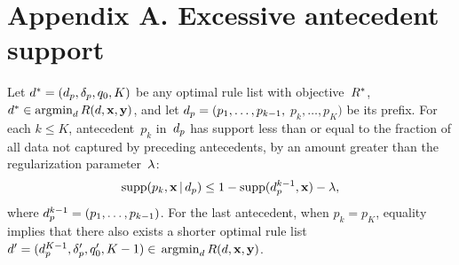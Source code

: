 \section*{Appendix A. Excessive antecedent support}

\begin{theorem}
\label{thm:ub-support}
Let ${d^* = (d_p, \delta_p, q_0, K)}$
be any optimal rule list with objective~$R^*$, \ie
${d^* \in \operatorname*{argmin}_{d} R({d}, \mathbf{x}, \mathbf{y})}$,
and let ${d_p = (p_1, \dots, p_{k-1},}$
${p_k, \dots, p_K)}$ be its prefix.
%
For each ${k \le K}$, antecedent~$p_k$ in~$d_p$
has support less than or equal to
the fraction of all data not captured by preceding antecedents,
by an amount greater than the regularization parameter~${\lambda}$:
\begin{align}
\textnormal{supp}(p_k, \mathbf{x} \,|\, d_p) \le 1 - \textnormal{supp}(d_p^{k-1}, \mathbf{x}) - {\lambda},
\label{eq:ub-support}
\end{align}
where ${d_p^{k-1} = (p_1, \dots, p_{k-1})}$.
%
For the last antecedent, \ie when ${p_k = p_K}$, equality implies
that there also exists a shorter optimal rule list
${{d}' = (d_p^{K-1}, \delta_p', q_0', K - 1) \in}$ ${\operatorname*{argmin}_{d} R({d}, \mathbf{x}, \mathbf{y})}$.
\end{theorem}


